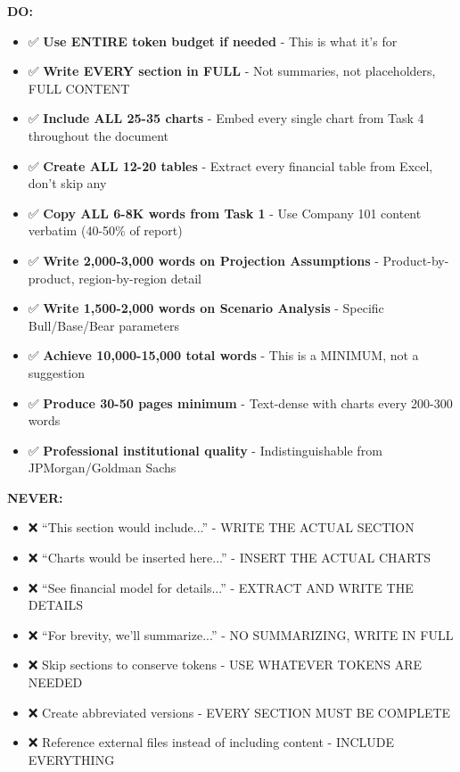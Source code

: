 \documentclass[11pt]{article}
\begin{document}
\textbf{DO:}

\begin{itemize}[leftmargin=*,itemsep=2pt,topsep=2pt]
\item {} ✅ \textbf{Use ENTIRE token budget if needed} - This is what it's for
\item {} ✅ \textbf{Write EVERY section in FULL} - Not summaries, not placeholders, FULL CONTENT
\item {} ✅ \textbf{Include ALL 25-35 charts} - Embed every single chart from Task 4 throughout the document
\item {} ✅ \textbf{Create ALL 12-20 tables} - Extract every financial table from Excel, don't skip any
\item {} ✅ \textbf{Copy ALL 6-8K words from Task 1} - Use Company 101 content verbatim (40-50\% of report)
\item {} ✅ \textbf{Write 2,000-3,000 words on Projection Assumptions} - Product-by-product, region-by-region detail
\item {} ✅ \textbf{Write 1,500-2,000 words on Scenario Analysis} - Specific Bull/Base/Bear parameters
\item {} ✅ \textbf{Achieve 10,000-15,000 total words} - This is a MINIMUM, not a suggestion
\item {} ✅ \textbf{Produce 30-50 pages minimum} - Text-dense with charts every 200-300 words
\item {} ✅ \textbf{Professional institutional quality} - Indistinguishable from JPMorgan/Goldman Sachs
\end{itemize}

\textbf{NEVER:}

\begin{itemize}[leftmargin=*,itemsep=2pt,topsep=2pt]
\item {} ❌ ``This section would include...'' - WRITE THE ACTUAL SECTION
\item {} ❌ ``Charts would be inserted here...'' - INSERT THE ACTUAL CHARTS
\item {} ❌ ``See financial model for details...'' - EXTRACT AND WRITE THE DETAILS
\item {} ❌ ``For brevity, we'll summarize...'' - NO SUMMARIZING, WRITE IN FULL
\item {} ❌ Skip sections to conserve tokens - USE WHATEVER TOKENS ARE NEEDED
\item {} ❌ Create abbreviated versions - EVERY SECTION MUST BE COMPLETE
\item {} ❌ Reference external files instead of including content - INCLUDE EVERYTHING
\end{itemize}
\end{document}
